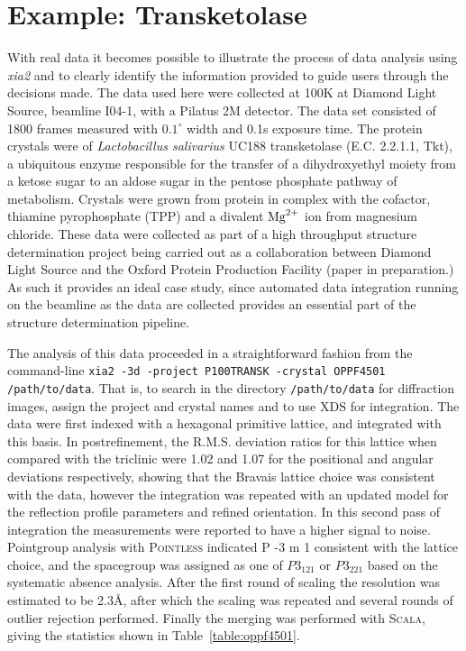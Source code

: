 \documentclass[preprint,pdf]{iucr}
\begin{document}
\section{Example: Transketolase}

With real data it becomes possible to illustrate the process of data
analysis using \emph{xia2} and to clearly identify the information
provided to guide users through the decisions made. The data
used here were collected at 100K at Diamond Light Source, beamline
I04-1, with a Pilatus 2M detector. The data set consisted of 1800
frames measured with $0.1^{\circ}$ width and 0.1s exposure time.
The protein crystals were of
\emph{Lactobacillus salivarius} UC188 transketolase (E.C. 2.2.1.1, Tkt), a
ubiquitous enzyme responsible for the transfer of a dihydroxyethyl
moiety from a ketose sugar to an aldose sugar in the pentose phosphate
pathway of metabolism. Crystals were grown from protein in complex
with the cofactor, thiamine pyrophosphate (TPP) and a divalent $\rm{Mg}^{2+}$
ion from magnesium chloride. These data were collected as part of
a high throughput structure determination project being carried out as
a collaboration between Diamond Light Source and the Oxford Protein
Production Facility (paper in preparation.) As such it provides an
ideal case study, since automated data integration running on the
beamline as the data are collected provides an essential part of the
structure determination pipeline. 

The analysis of this data proceeded in a straightforward fashion from
the command-line 
\verb|xia2 -3d -project P100TRANSK -crystal OPPF4501 /path/to/data|.
That is, to search in the directory \verb|/path/to/data| for
diffraction images, assign the project and crystal names and to use
XDS for integration. 
The data were first indexed with a hexagonal primitive lattice, and
integrated with this basis. In postrefinement, the R.M.S. deviation
ratios for this lattice when compared with the triclinic were 1.02 and
1.07 for the positional and angular deviations respectively, showing
that the Bravais lattice choice was consistent with the data, however
the integration was repeated with an updated model for the reflection
profile parameters
and refined orientation. In this second pass of integration the
measurements were reported to have a higher signal to noise. Pointgroup
analysis with \textsc{Pointless} indicated P -3 m 1 consistent with the lattice
choice, and the spacegroup was assigned as one of $P3_121$ or $P3_221$
based on the systematic absence analysis. After the first round of
scaling the resolution was estimated to be 2.3\AA, after which
the scaling was repeated and several rounds of outlier rejection
performed. Finally the merging was performed with \textsc{Scala}, giving the
statistics shown in Table~\ref{table:oppf4501}. 
\end{document}

